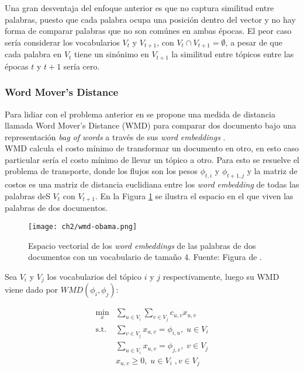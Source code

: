 \documentclass[letterpaper,12pt,oneside]{book} %
\begin{document}
Una gran desventaja del enfoque anterior es que no captura similitud entre palabras, puesto que cada palabra ocupa una posición dentro del vector y no hay forma de comparar palabras que no son comúnes en ambas épocas. El peor caso sería considerar los vocabularios $V_{t}$ y $V_{t+1}$, con $V_{t}\cap V_{t+1} =  \emptyset$, a pesar de que cada palabra en $V_{t}$ tiene un sinónimo en $V_{t+1}$ la similitud entre tópicos entre las épocas $t$ y $t+1$ sería cero.\\

\subsubsection{Word Mover's Distance}

Para lidiar con el problema anterior en \citep{kusner2015word} se propone una medida de distancia llamada Word Mover's Distance (WMD) para comparar dos documento bajo una representación \textit{bag of words} a través de sus \textit{word embeddings} \citep{mikolov2013distributed}.\\

WMD calcula el costo mínimo de transformar un documento en otro, en esto caso particular sería el costo mínimo de llevar un tópico a otro. Para esto se resuelve el problema de transporte, donde los flujos son los pesos $\phi_{t,i}$ y $\phi_{t+1,j}$ y la matriz de costos es una matriz de distancia euclidiana entre los \textit{word embedding} de todas las palabras deS $V_{t}$ con $V_{t+1}$. En la Figura \ref{img:wmd_obama} se ilustra el espacio en el que viven las palabras de dos documentos.

\begin{figure}
    \centering
    \texttt{[image: ch2/wmd-obama.png]}
    \caption{Espacio vectorial de los \textit{word embeddings} de las palabras de dos documentos con un vocabulario de tamaño 4. Fuente: Figura de \citep{WMDPy}.}
    \label{img:wmd_obama}
\end{figure}


Sea  $V_{i}$ y $V_{j}$ los vocabularios del tópico $i$ y $j$ respectivamente, luego su WMD viene dado por $WMD(\phi_{i}, \phi_{j})$:

\begin{align}
\underset{x}{\text{min}}&\sum_{u \in V_{i}}\sum_{v \in V_{j}} c_{u,v}x_{u,v} \\ 
\textrm{s.t.} &\sum_{v \in V_{j}}x_{u,v}= \phi_{i,u}, \; u \in V_{i}\\ 
& \sum_{u \in V_{i}}x_{u,v}= \phi_{j,v}, \; v\in V_{j}\\
& x_{u,v} \geq 0,\; u \in V_{i} \;, v \in V_{j}\\ \nonumber
\end{align}
\end{document}
